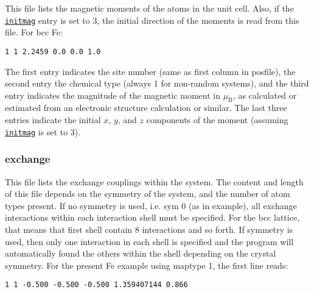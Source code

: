 \documentclass[11pt,fleqn,a4]{book} %
\newcommand{\rkeyword}[1]{\hyperref[#1]{\texttt{#1}}}
\newcommand{\rfilename}[1]{\hyperref[#1]{\texttt{#1}}}
\begin{document}
This file lists the magnetic moments of the atoms in the unit cell. Also, if the \rkeyword{initmag} entry is set to 3, the initial direction of the moments is read from this file. For bcc Fe:

\begin{fBox} 
\begin{Verbatim}
1 1 2.2459 0.0 0.0 1.0 
\end{Verbatim}
\end{fBox}

The first entry indicates the site number (same as first column in posfile), the second entry the chemical type (always 1 for non-random systems), and the third entry indicates the magnitude of the magnetic moment in $\mu_{\mathrm{B}}$, as calculated or estimated from an electronic structure calculation or similar. The last three entries indicate the initial $x$, $y$, and $z$ components of the moment (assuming  \rkeyword{initmag} is set to 3).



\subsubsection*{exchange \label{fxc}}

This file lists the exchange couplings within the system. The content and length of this file depends on the symmetry of the system, and the number of atom types present. If no symmetry is used, i.e. sym 0 (as in example), all exchange interactions within each interaction shell must be specified. For the bcc lattice, that means that first shell contain 8 interactions and so forth. If symmetry is used, then only one interaction in each shell is specified and the program will automatically found the others within the shell depending on the crystal symmetry. For the present Fe example using maptype 1, the first line reads:

\begin{fBox} 
\begin{Verbatim}
1 1 -0.500 -0.500 -0.500 1.359407144 0.866
\end{Verbatim}
\end{fBox}
\end{document}
